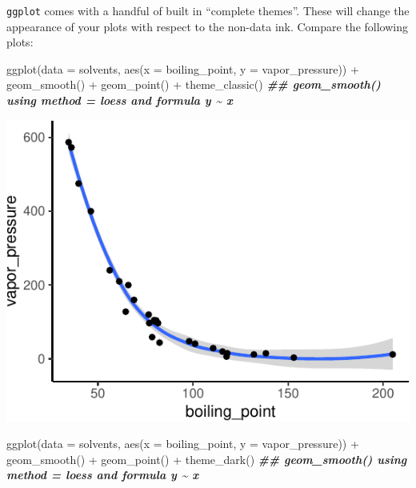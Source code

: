 \documentclass[
]{krantz}
\newenvironment{Shaded}{\begin{snugshade}}{\end{snugshade}}
\newcommand{\AttributeTok}[1]{\textcolor[rgb]{0.77,0.63,0.00}{#1}}
\newcommand{\DocumentationTok}[1]{\textcolor[rgb]{0.56,0.35,0.01}{\textbf{\textit{#1}}}}
\newcommand{\FunctionTok}[1]{\textcolor[rgb]{0.00,0.00,0.00}{#1}}
\newcommand{\NormalTok}[1]{#1}
\newcommand{\SpecialCharTok}[1]{\textcolor[rgb]{0.00,0.00,0.00}{#1}}
\begin{document}
\texttt{ggplot} comes with a handful of built in ``complete themes''. These will change the appearance of your plots with respect to the non-data ink. Compare the following plots:

\begin{Shaded}
\begin{Highlighting}[]
\FunctionTok{ggplot}\NormalTok{(}\AttributeTok{data =}\NormalTok{ solvents, }\FunctionTok{aes}\NormalTok{(}\AttributeTok{x =}\NormalTok{ boiling\_point, }\AttributeTok{y =}\NormalTok{ vapor\_pressure)) }\SpecialCharTok{+} 
  \FunctionTok{geom\_smooth}\NormalTok{() }\SpecialCharTok{+}
  \FunctionTok{geom\_point}\NormalTok{() }\SpecialCharTok{+}
  \FunctionTok{theme\_classic}\NormalTok{()}
\DocumentationTok{\#\# \textasciigrave{}geom\_smooth()\textasciigrave{} using method = \textquotesingle{}loess\textquotesingle{} and formula \textquotesingle{}y \textasciitilde{} x\textquotesingle{}}
\end{Highlighting}
\end{Shaded}

\begin{center}\includegraphics[width=0.8\linewidth]{index_files/figure-latex/unnamed-chunk-63-1} \end{center}

\begin{Shaded}
\begin{Highlighting}[]
\FunctionTok{ggplot}\NormalTok{(}\AttributeTok{data =}\NormalTok{ solvents, }\FunctionTok{aes}\NormalTok{(}\AttributeTok{x =}\NormalTok{ boiling\_point, }\AttributeTok{y =}\NormalTok{ vapor\_pressure)) }\SpecialCharTok{+} 
  \FunctionTok{geom\_smooth}\NormalTok{() }\SpecialCharTok{+}
  \FunctionTok{geom\_point}\NormalTok{() }\SpecialCharTok{+}
  \FunctionTok{theme\_dark}\NormalTok{()}
\DocumentationTok{\#\# \textasciigrave{}geom\_smooth()\textasciigrave{} using method = \textquotesingle{}loess\textquotesingle{} and formula \textquotesingle{}y \textasciitilde{} x\textquotesingle{}}
\end{Highlighting}
\end{Shaded}
\end{document}

